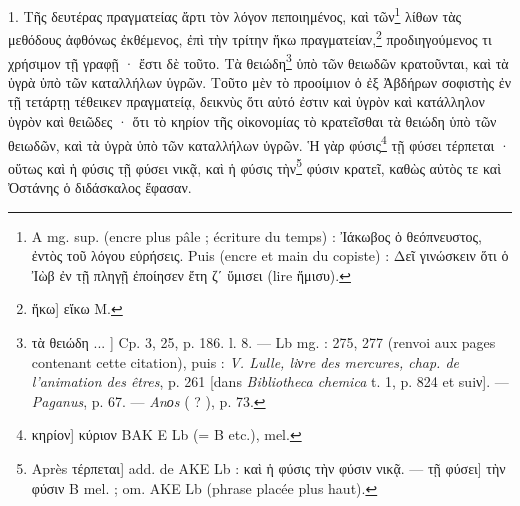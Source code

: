 \documentclass[a4paper, 11pt, oneside, polutonikogreek, french]{article}
\begin{document}
1. Τῆς δευτέρας πραγματείας ἄρτι τὸν λόγον πεποιημένος, καὶ τῶν\footnote{A mg. sup. (encre plus pâle ; écriture du temps) : Ἰάκωβος ὁ θεόπνευστος, ἐντὸς τοῦ λόγου εὑρήσεις. Puis (encre et main du copiste) : Δεῖ γινώσκειν ὅτι ὁ Ἰὼβ ἐν τῇ πληγῇ ἐποίησεν ἔτη ζʹ ὕμισει (lire ἥμισυ).} λίθων τὰς μεθόδους ἀφθόνως ἐκθέμενος, ἐπὶ τὴν τρίτην ἥκω πραγματείαν,\footnote{ἥκω] εἴκω M.} προδιηγούμενος τι χρήσιμον τῇ γραφῇ · ἔστι δὲ τοῦτο. Τὰ θειώδη\footnote{τὰ θειώδη ... ] Cp. 3, 25, p. 186. l. 8. --- Lb mg. : 275, 277 (renvoi aux pages contenant cette citation), puis : \emph{V. Lulle, liνre des mercures, chap. de l'animation des êtres}, p. 261 [dans \emph{Bibliotheca chemica} t. 1, p. 824 et suiν]. --- \emph{Paganus}, p. 67. --- \emph{Anοs} ( ? ), p. 73.} ὑπὸ τῶν θειωδῶν κρατοῦνται, καὶ τὰ ὑγρὰ ὑπὸ τῶν καταλλήλων ὑγρῶν. Τοῦτο μὲν τὸ προοίμιον ὁ ἐξ Ἀβδήρων σοφιστὴς ἐν τῇ τετάρτῃ τέθεικεν πραγματείᾳ, δεικνὺς ὅτι αὐτό ἐστιν καὶ ὑγρὸν καὶ κατάλληλον ὑγρὸν καὶ θειῶδες · ὅτι τὸ κηρίον τῆς οἰκονομίας τὸ κρατεῖσθαι τὰ θειώδη ὑπὸ τῶν θειωδῶν, καὶ τὰ ὑγρὰ ὑπὸ τῶν καταλλήλων ὑγρῶν. Ἡ γὰρ φύσις\footnote{κηρίον] κύριον BAK E Lb (= B etc.), mel.} τῇ φύσει τέρπεται · οὕτως καὶ ἡ φύσις τῇ φύσει νικᾷ, καὶ ἡ φύσις τὴν\footnote{Après τέρπεται] add. de AKE Lb : καὶ ἡ φύσις τὴν φύσιν νικᾷ. --- τῇ φύσει] τὴν φύσιν B mel. ; om. AKE Lb (phrase placée plus haut).} φύσιν κρατεῖ, καθὼς αὐτὸς τε καὶ Ὀστάνης ὁ διδάσκαλος ἔφασαν.
\end{document}
